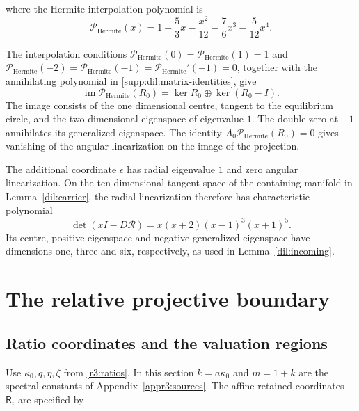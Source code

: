 where the Hermite interpolation polynomial is
\begin{equation}\label{supp:dil:hermite-projector}
                  \mathcal P_{\mathrm{Hermite}}(x)=1+\frac53x-\frac{x^2}{12}
                            -\frac76x^3-\frac5{12}x^4.
\end{equation}

The interpolation conditions
$\mathcal P_{\mathrm{Hermite}}(0)=\mathcal P_{\mathrm{Hermite}}(1)=1$
and $\mathcal P_{\mathrm{Hermite}}(-2)=\mathcal P_{\mathrm{Hermite}}(-1)
=\mathcal P_{\mathrm{Hermite}}'(-1)=0$, together with the annihilating
polynomial in \eqref{supp:dil:matrix-identities}, give
\[
 \operatorname{im}\mathcal P_{\mathrm{Hermite}}(R_0)
     =\ker R_0\oplus\ker(R_0-I).
\]
The image consists of the one dimensional centre, tangent to the
equilibrium circle, and the two dimensional eigenspace of eigenvalue
$1$. The double zero at $-1$ annihilates its generalized eigenspace.
The identity $A_0\mathcal P_{\mathrm{Hermite}}(R_0)=0$ gives vanishing
of the angular linearization on the image of the projection.

The additional coordinate $\epsilon$ has radial eigenvalue $1$
and zero angular linearization. On the ten dimensional tangent
space of the containing manifold in Lemma~\ref{dil:carrier},
the radial linearization therefore has characteristic polynomial
\begin{equation}\label{supp:dil:carrier-spectrum}
             \det(xI-D\mathcal R)=x(x+2)(x-1)^3(x+1)^5.
\end{equation}
Its centre, positive eigenspace and negative generalized eigenspace
have dimensions one, three and six, respectively, as used in
Lemma~\ref{dil:incoming}.

\clearpage
\section{The relative projective boundary}\label{supp:boundary}

\subsection{Ratio coordinates and the valuation regions}

Use $\kappa_0,q,\eta,\zeta$ from \eqref{r3:ratios}. In this
section $k=a\kappa_0$ and $m=1+k$ are the spectral constants of
Appendix~\ref{appr3:sources}. The affine retained coordinates
$\mathsf R_i$ are specified by

